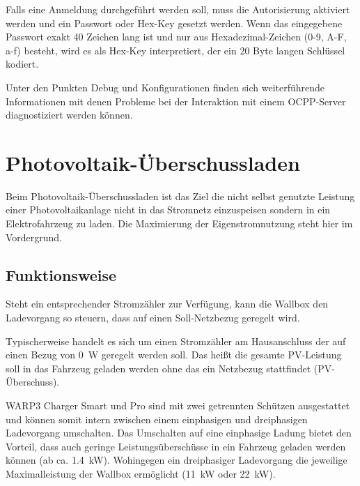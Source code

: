 \documentclass[a4paper,10pt]{article}
\begin{document}
\begin{multicols*}{2}
    Falls eine Anmeldung durchgeführt werden soll, muss die Autorisierung aktiviert werden
    und ein Passwort oder Hex-Key gesetzt werden. Wenn das eingegebene Passwort exakt 40 Zeichen lang ist
    und nur aus Hexadezimal-Zeichen (0-9, A-F, a-f) besteht, wird es als Hex-Key interpretiert, der ein 20
    Byte langen Schlüssel kodiert.

    Unter den Punkten Debug und Konfigurationen finden sich weiterführende Informationen mit denen Probleme
    bei der Interaktion mit einem OCPP-Server diagnostiziert werden können.

	\newpage
	\section{Photovoltaik-Überschussladen}\label{pv_charge}
	Beim Photovoltaik-Überschussladen ist das Ziel die nicht selbst genutzte Leistung einer
	Photovoltaikanlage nicht in das Stromnetz einzuspeisen sondern in ein
	Elektrofahrzeug zu laden. Die Maximierung der Eigenstromnutzung steht hier
	im Vordergrund.

	\subsection{Funktionsweise}
	Steht ein entsprechender Stromzähler zur Verfügung, kann die Wallbox den
	Ladevorgang so steuern, dass auf einen Soll-Netzbezug geregelt wird.
	\par
	Typischerweise handelt es sich um einen Stromzähler am Hausanschluss der auf
	einen Bezug von \SI{0}{\watt} geregelt werden soll. Das heißt die gesamte
	PV-Leistung soll in das Fahrzeug geladen werden ohne das ein Netzbezug
	stattfindet (\glqq PV-Überschuss\grqq).
	\par
	WARP3 Charger Smart und Pro sind mit zwei getrennten Schützen
	ausgestattet und können somit intern zwischen einem einphasigen und dreiphasigen
	Ladevorgang umschalten. Das Umschalten auf eine einphasige Ladung bietet den Vorteil, dass auch geringe
	Leistungsüberschüsse in ein Fahrzeug geladen werden können (ab ca.
	\SI{1,4}{\kilo\watt}). Wohingegen ein dreiphasiger Ladevorgang die jeweilige
	Maximalleistung der Wallbox ermöglicht (\SI{11}{\kilo\watt} oder
	\SI{22}{\kilo\watt}).

\end{multicols*}
\end{document}
